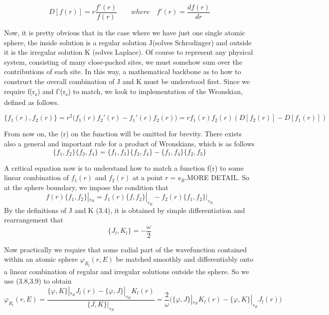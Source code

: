 \documentclass[12pt]{article}
\begin{document}
\begin{equation} \label{3.6} \tag{3.6}
D[f(r)]= r \frac{f'(r)}{f(r)} \qquad where \quad f'(r)=\frac{df(r)}{dr}
\end{equation}

Now, it is pretty obvious that in the case where we have just one single atomic sphere, the inside solution is a regular solution J(solves Schrodinger) and outside it is the irregular solution K (solves Laplace). 
Of course to represent any physical system, consisting of many close-packed sites, we must somehow sum over the contributions of each site. In this way, a mathematical backbone as to how to construct the overall combination of J and K must be understood first.
Since we require f(r\textsubscript{s}) and f'(r\textsubscript{s}) to match, we look to implementation of the Wronskian, defined as follows.

\begin{equation} \label{3.6} \tag{3.6}
\{f_1(r),f_2(r)\}= r^2 \big(f_1(r)f_2'(r)-f_1'(r)f_2(r)\big)=rf_1(r)f_2(r) (D[f_2(r)]-D[f_1(r)])
\end{equation}

From now on, the (r) on the function will be omitted for brevity. There exists also a general and important rule for a product of Wronskians, which is as follows
\begin{equation} \label{3.7} \tag{3.7}
\{f_1,f_2\}\{f_3,f_4\}=\{f_1,f_3\}\{f_2,f_4\}-\{f_1,f_4\}\{f_2,f_3\}
\end{equation}

A critical equation now is to understand how to match a function f(r) to some linear combination of $f_1(r)$ and $f_2(r)$ at a point $r=s_R$.MORE DETAIL. So at the sphere boundary, we impose the condition that
\begin{equation} \label{3.8} \tag{3.8}
f(r)\{f_1,f_2\}|_{s_R}=f_1(r)\{f,f_2\}|_{s_R}-f_2(r)\{f_1,f_2\}|_{s_R}
\end{equation}
By the definitions of J and K (3.4), it is obtained by simple differentiation and rearrangement that 
\begin{equation} \label{3.9} \tag{3.9}
\{J_l,K_l\}=-\frac{\omega}{2}
\end{equation}

Now practically we require that some radial part of the wavefunction contained within an atomic sphere $\varphi_R_l(r,E)$ be matched smoothly and differentiably onto a linear combination of regular and irregular solutions outside the sphere. So we use (3.8,3.9) to obtain
\begin{equation} \label{3.10} \tag{3.10}
\varphi_R_l(r,E)=\frac{\{\varphi,K\}|_{s_R}J_l(r)-\{\varphi,J\}|_{s_R}K_l(r)}{\{J,K\}|_{s_R}}=\frac{2}{\omega}\bigg(\{\varphi,J\}|_{s_R}K_l(r)-\{\varphi,K\}|_{s_R}J_l(r)\bigg)
\end{equation}
\end{document}
